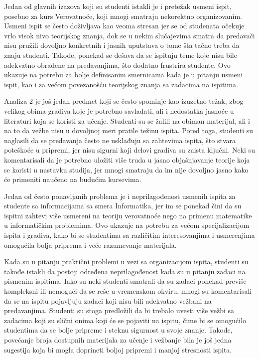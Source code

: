\documentclass[a4paper]{article}
\begin{document}
Jedan od glavnih izazova koji su studenti istakli je i pretežak usmeni ispit, posebno za kurs Verovatnoće, koji mnogi smatraju nekorektno organizovanim. Usmeni ispit se često doživljava kao veoma stresan jer se od studenata očekuje vrlo visok nivo teorijskog znanja, dok se u nekim slučajevima smatra da predavači nisu pružili dovoljno konkretnih i jasnih uputstava o tome šta tačno treba da znaju studenti. Takođe, ponekad se dešava da se ispituju teme koje nisu bile adekvatno obrađene na predavanjima, što dodatno frustrira studente. Ovo ukazuje na potrebu za bolje definisanim smernicama kada je u pitanju usmeni ispit, kao i za većom povezanošću teorijskog znanja sa zadacima na ispitima.

Analiza 2 je još jedan predmet koji se često spominje kao izuzetno težak, zbog velikog obima gradiva koje je potrebno savladati, ali i nedostatka jasnoće u literaturi koja se koristi za učenje. Studenti su se žalili na obiman materijal, ali i na to da vežbe nisu u dovoljnoj meri pratile težinu ispita. Pored toga, studenti su naglasili da se predavanja često ne usklađuju sa zahtevima ispita, što stvara poteškoće u pripremi, jer nisu sigurni koji delovi gradiva su zaista ključni. Neki su komentarisali da je potrebno uložiti više truda u jasno objašnjavanje teorije koja se koristi u nastavku studija, jer mnogi smatraju da im nije dovoljno jasno kako će primeniti naučeno na budućim kursevima.

Jedan od često ponavljanih problema je i neprilagođenost usmenih ispita za studente sa informacijama sa smera Informatika, jer im se ponekad čini da su ispitni zahtevi više usmereni na teoriju verovatnoće nego na primenu matematike u informatičkim problemima. Ovo ukazuje na potrebu za većom specijalizacijom ispita i gradiva, kako bi se studentima sa različitim interesovanjima i usmerenjima omogućila bolja priprema i veće razumevanje materijala.

Kada su u pitanju praktični problemi u vezi sa organizacijom ispita, studenti su takođe istakli da postoji određena neprilagođenost kada su u pitanju zadaci na pismenim ispitima. Iako su neki studenti smatrali da su zadaci ponekad previše kompleksni ili nemogući da se reše u vremenskom okviru, mnogi su komentarisali da se na ispitu pojavljuju zadaci koji nisu bili adekvatno vežbani na predavanjima. Studenti su stoga predložili da bi trebalo uvesti više vežbi sa zadacima koji su slični onima koji će se pojaviti na ispitu, čime bi se omogućilo studentima da se bolje pripreme i steknu sigurnost u svoje znanje. Takođe, povećanje broja dostupnih materijala za učenje i vežbanje bila je još jedna sugestija koja bi mogla doprineti boljoj pripremi i manjoj stresnosti ispita.
\end{document}
